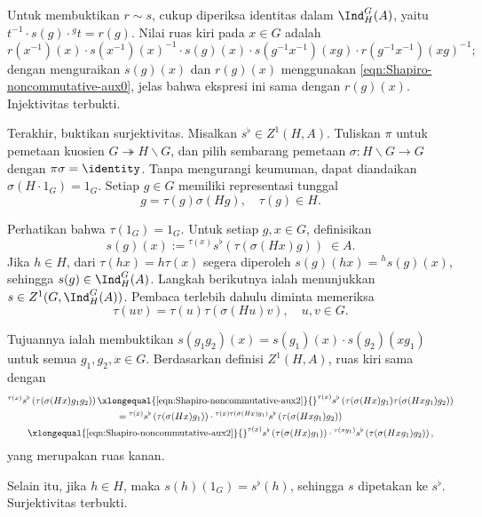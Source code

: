 \begin{bukti}
	Untuk membuktikan $r\sim s$, cukup diperiksa identitas dalam
	$\Ind^G_H(A)$, yaitu $t^{-1}\cdot s(g)\cdot{}^gt=r(g)$. Nilai ruas kiri
	pada $x\in G$ adalah
	\[ r(x^{-1})(x) \cdot s(x^{-1})(x)^{-1} \cdot s(g)(x) \cdot s(g^{-1} x^{-1})(xg) \cdot r(g^{-1} x^{-1})(xg)^{-1}; \]
	dengan menguraikan $s(g)(x)$ dan $r(g)(x)$ menggunakan
	\eqref{eqn:Shapiro-noncommutative-aux0}, jelas bahwa ekspresi ini sama
	dengan $r(g)(x)$. Injektivitas terbukti.
	
	Terakhir, buktikan surjektivitas. Misalkan $s^\flat\in Z^1(H,A)$.
	Tuliskan $\pi$ untuk pemetaan kuosien $G\twoheadrightarrow H\backslash G$,
	dan pilih sembarang pemetaan $\sigma:H\backslash G\to G$ dengan
	$\pi\sigma=\identity$. Tanpa mengurangi keumuman, dapat diandaikan
	$\sigma(H\cdot1_G)=1_G$. Setiap $g\in G$ memiliki representasi tunggal
	\[ g = \tau(g) \sigma(Hg), \quad \tau(g) \in H. \]
	
	Perhatikan bahwa $\tau(1_G)=1_G$. Untuk setiap $g,x\in G$, definisikan
	\[ s(g)(x) := {}^{\tau(x)} s^\flat\left( \tau(\sigma(Hx)g) \right) \; \in A. \]
	Jika $h\in H$, dari $\tau(hx)=h\tau(x)$ segera diperoleh
	$s(g)(hx)={}^hs(g)(x)$, sehingga $s(g)\in\Ind^G_H(A)$. Langkah berikutnya
	ialah menunjukkan $s\in Z^1(G,\Ind^G_H(A))$. Pembaca terlebih dahulu
	diminta memeriksa
	\begin{equation}\label{eqn:Shapiro-noncommutative-aux2}
		\tau(uv) = \tau(u) \tau(\sigma(Hu)v), \quad u, v \in G.
	\end{equation}
	
	Tujuannya ialah membuktikan
	$s(g_1g_2)(x)=s(g_1)(x)\cdot s(g_2)(xg_1)$ untuk semua
	$g_1,g_2,x\in G$. Berdasarkan definisi $Z^1(H,A)$, ruas kiri sama dengan
	\begin{multline*}
		{}^{\tau(x)} s^\flat\left( \tau(\sigma(Hx)g_1 g_2) \right) \xlongequal{\text{\eqref{eqn:Shapiro-noncommutative-aux2}}} {}^{\tau(x)} s^\flat\left( \tau(\sigma(Hx)g_1) \tau(\sigma(Hx g_1)g_2) \right) \\
		= {}^{\tau(x)} s^\flat\left( \tau(\sigma(Hx)g_1) \right) \cdot {}^{\tau(x)\tau(\sigma(Hx)g_1)} s^\flat\left( \tau(\sigma(Hxg_1)g_2) \right) \\
		\xlongequal{\text{\eqref{eqn:Shapiro-noncommutative-aux2}}} {}^{\tau(x)} s^\flat\left( \tau(\sigma(Hx)g_1) \right) \cdot {}^{\tau(xg_1)} s^\flat\left( \tau(\sigma(Hxg_1)g_2) \right),
	\end{multline*}
yang merupakan ruas kanan.

	Selain itu, jika $h\in H$, maka $s(h)(1_G)=s^\flat(h)$, sehingga $s$
	dipetakan ke $s^\flat$. Surjektivitas terbukti.
\end{bukti}

